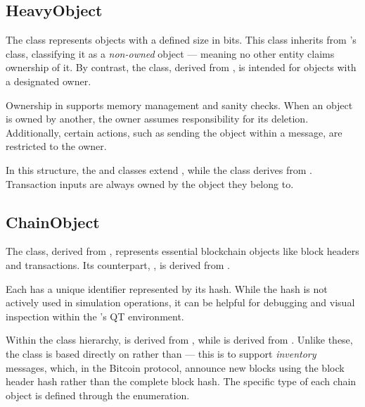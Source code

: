 \subsection{HeavyObject}\label{subsec:impl-heavyobject}

The  class represents objects with a defined size in bits.
This class inherits from \omnetpp{}'s  class, classifying it
as a \emph{non-owned} object --- meaning no other entity claims ownership of
it. By contrast, the  class, derived from
, is intended for objects with a designated owner.

Ownership in \omnetpp{} supports memory management and sanity checks. When an
object is owned by another, the owner assumes responsibility for its deletion.
Additionally, certain actions, such as sending the object within a message, are
restricted to the owner.

In this structure, the  and  classes extend
, while the  class derives from
. Transaction inputs are always owned by the
 object they belong to.

\subsection{ChainObject}\label{subsec:impl-chainobject}

The  class, derived from , represents
essential blockchain objects like block headers and transactions. Its
counterpart, , is derived from .

Each  has a unique identifier represented by its hash. While
the hash is not actively used in simulation operations, it can be helpful for
debugging and visual inspection within the \omnetpp{}'s QT environment.

Within the class hierarchy,  is derived from
, while  is derived from
. Unlike these, the  class is based directly
on  rather than  --- this is to support
\emph{inventory} messages, which, in the Bitcoin protocol, announce new blocks
using the block header hash rather than the complete block hash. The specific
type of each chain object is defined through the  enumeration.

